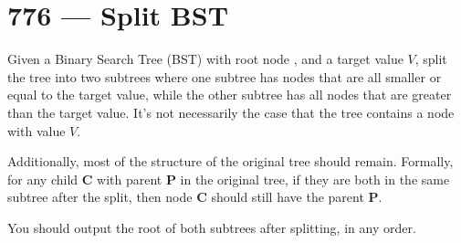 \section{776 --- Split BST}
Given a Binary Search Tree (BST) with root node , and a target value $V$, split the tree into two subtrees where one subtree has nodes that are all smaller or equal to the target value, while the other subtree has all nodes that are greater than the target value.  It's not necessarily the case that the tree contains a node with value $V$.

Additionally, most of the structure of the original tree should remain.  Formally, for any child \textbf{C} with parent \textbf{P} in the original tree, if they are both in the same subtree after the split, then node \textbf{C} should still have the parent \textbf{P}.

You should output the root  of both subtrees after splitting, in any order.

